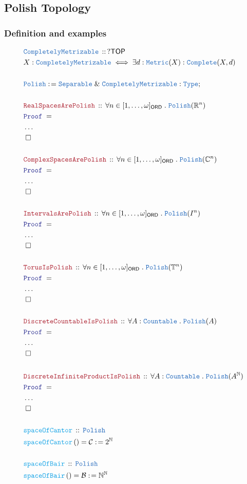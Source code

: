 \documentclass[12pt]{scrartcl}
\newcommand{\TYPE}[1]{\textcolor{NavyBlue}{\mathtt{#1}}}
\newcommand{\FUNC}[1]{\textcolor{Cerulean}{\mathtt{#1}}}
\newcommand{\LOGIC}[1]{\textcolor{Blue}{\mathtt{#1}}}
\newcommand{\THM}[1]{\textcolor{Maroon}{\mathtt{#1}}}
\renewcommand{\.}{\; . \;}
\newcommand{\de}{: \kern 0.1pc =}
\newcommand{\Act}[1]{\left( #1 \right)}
\newcommand{\Theorem}[2]{& \THM{#1} \, :: \, #2 \\ & \Proof = \\ }
\newcommand{\DeclareType}[2]{& \TYPE{#1} \, :: \, #2 \\}
\newcommand{\DefineType}[3]{& #1 : \TYPE{#2} \iff #3 \\}
\newcommand{\DeclareFunc}[2]{& \FUNC{#1} \, :: \, #2 \\}
\newcommand{\DefineNamedFunc}[4]{&  \FUNC{#1}\Act{#2} = #3 \de #4 \\}
\newcommand{\Page}[1]{ \begin{align*} #1 \end{align*}   }
\newcommand{\NoProof}{ & \ldots \\ \EndProof}
\renewcommand{\And}{\; \& \;}
\newcommand{\Type}{\TYPE{Type}}
\newcommand{\Reals}{\mathbb{R} }
\newcommand{\Complex}{\mathbb{C}}
\newcommand{\Nat}{\mathbb{N} }
\newcommand{\Conclude}[3]{& #1 \de #2 : #3; \\}
\newcommand{\QED}{\; \square}
\newcommand{\EndProof}{& \QED \\}
\newcommand{\Proof}{\LOGIC{Proof} \; }
\newcommand{\C}{\mathcal{C}}
\newcommand{\B}{\mathcal{B}}
\newcommand{\ORD}{\mathsf{ORD}}
\newcommand{\TOP}{\mathsf{TOP}}
\newcommand{\Polish}{\TYPE{Polish}}
\begin{document}
\subsection{Polish Topology}
\subsubsection{Definition and examples}
\Page{
	\DeclareType{CompletelyMetrizable}{?\TOP}
	\DefineType{X}{CompletelyMetrizable}
	{
		\exists d : \TYPE{Metric}(X) :
		\TYPE{Complete}(X,d)
	}
	\\
	\Conclude{\TYPE{Polish}}{\TYPE{Separable} \And \TYPE{CompletelyMetrizable}}{\Type}
	\\
	\Theorem{RealSpacesArePolish}
	{
		\forall n \in [1,\ldots,\omega]_\ORD \. 
		\Polish(\Reals^n )
	}
	\NoProof
	\\
	\Theorem{ComplexSpacesArePolish}
	{
		\forall n \in [1,\ldots,\omega]_\ORD \. 
		\Polish(\Complex^n )
	}
	\NoProof
	\\
	\Theorem{IntervalsArePolish}
	{
		\forall n \in [1,\ldots,\omega]_\ORD \. 
		\Polish(I^n )
	}
	\NoProof
	\\
	\Theorem{TorusIsPolish}
	{
		\forall n \in [1,\ldots,\omega]_\ORD \. 
		\Polish(\mathbb{T}^n )
	}
	\NoProof	
	\\
	\Theorem{DiscreteCountableIsPolish}
	{
		\forall A : \TYPE{Countable} \.
		\Polish(A)
	}
	\NoProof
	\\
	\Theorem{DiscreteInfiniteProductIsPolish}
	{
		\forall A : \TYPE{Countable} \.
		\Polish(A^\Nat)
	}
	\NoProof
	\\
	\DeclareFunc{spaceOfCantor}{\Polish}
	\DefineNamedFunc{spaceOfCantor}{}{\C}{2^\Nat}
	\\
	\DeclareFunc{spaceOfBair}{\Polish}
	\DefineNamedFunc{spaceOfBair}{}{\B}{\Nat^\Nat}
}
\newpage
\end{document}

